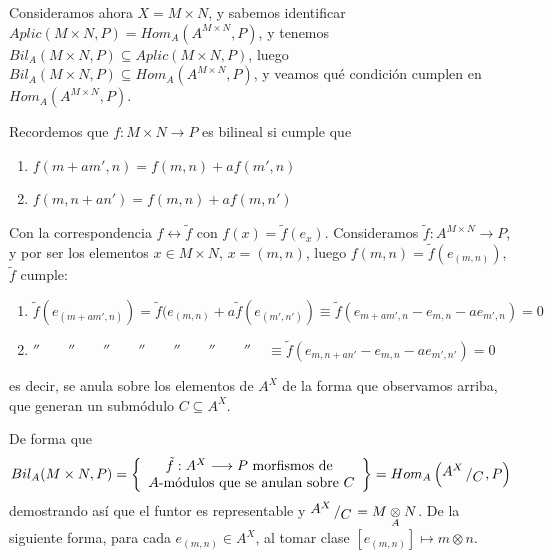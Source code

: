 Consideramos ahora $X = M\times N$, y sabemos identificar $Aplic(M \times N, P) = Hom_A(A^{M \times N}, P)$, y tenemos $Bil_A(M\times N, P) \subseteq Aplic(M \times N, P)$, luego $Bil_A(M\times N, P) \subseteq Hom_A(A^{M \times N}, P)$, y veamos qu\'e condici\'on cumplen en $Hom_A(A^{M \times N}, P)$. 

Recordemos que $f: M\times N \longrightarrow P$ es bilineal si cumple que
\begin{enumerate}
    \item $f(m +am', n) = f(m,n) + af(m',n)$
    \item $f(m,n+an') = f(m,n) + af(m,n')$
\end{enumerate}
Con la correspondencia $f \longleftrightarrow \tilde f$ con $f(x) = \tilde f(e_x)$. Consideramos $\tilde f: A^{M \times N} \longrightarrow P$, y por ser los elementos $x\in M \times N$, $x=(m,n)$, luego $f(m,n) = \tilde f(e_{(m,n)})$, $\tilde f$ cumple:
\begin{enumerate}
    \item $\tilde f(e_{(m+am', n)}) = \tilde f(e_{(m,n)} + a \tilde f(e_{(m',n')}) \equiv  \tilde f (e_{m+am', n} - e_{m, n} -a e_{m', n} ) = 0 $
    \item $'' \qquad '' \qquad '' \qquad '' \qquad '' \qquad '' \qquad '' \quad  \,  \equiv\tilde f (e_{m, n+an'} - e_{m, n} -a e_{m', n'} ) = 0  $
\end{enumerate}
es decir, se anula sobre los elementos de $A^X$ de la forma que observamos arriba, que generan un subm\'odulo $C \subseteq A^X$. 

De forma que 
$$Bil_A(M \times  N, P) = \left\{ \begin{array}{c}
      \tilde f: A^X \longrightarrow P \text{ morfismos de } \\
      A{\text{-m\'odulos que se anulan sobre }C}
\end{array} \right\} = Hom_A\left(\modulo{A^X}{C}, P\right)$$
demostrando as\'i que el funtor es representable y $\modulo{A^X}{C} = M \underset{A}{\otimes} N$. De la siguiente forma, para cada $e_{(m,n)} \in A^X$, al tomar clase $[e_{(m,n)}] \longmapsto m \otimes n$. 

